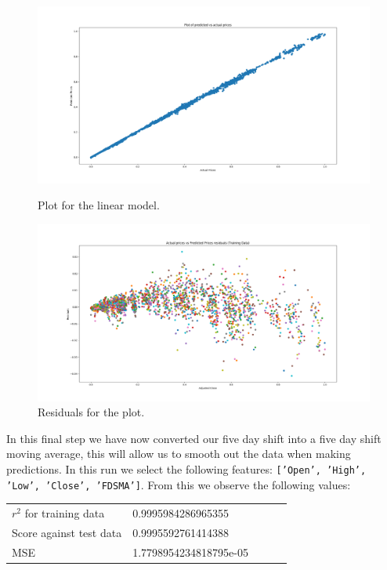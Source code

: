 \documentclass[11pt]{report}
\begin{document}
\begin{figure}[ht]
\begin{minipage}[b]{.5\textwidth}
\centering
\includegraphics[width=1\textwidth]{plot3.png}
\caption{Plot for the linear model.}
\end{minipage}
\hfill
\begin{minipage}[b]{.5\textwidth}
\centering
\includegraphics[width=1\textwidth]{resid3.png}
\caption{Residuals for the plot.}
\end{minipage}
\end{figure}

\noindent
In this final step we have now converted our five day shift into a five day shift moving average, this will allow us to smooth out the data when making predictions. In this run we select the following features: \texttt{['Open', 'High', 'Low', 'Close', 'FDSMA']}. From this we observe the following values:

\begin{table}[ht]
\centering
\begin{tabular}{lllll}
$r^2$ for training data & 0.9995984286965355 &  \\
Score against test data & 0.9995592761414388 &  \\
MSE & 1.7798954234818795e-05 &  \\
\end{tabular}
\end{table}
\end{document}
